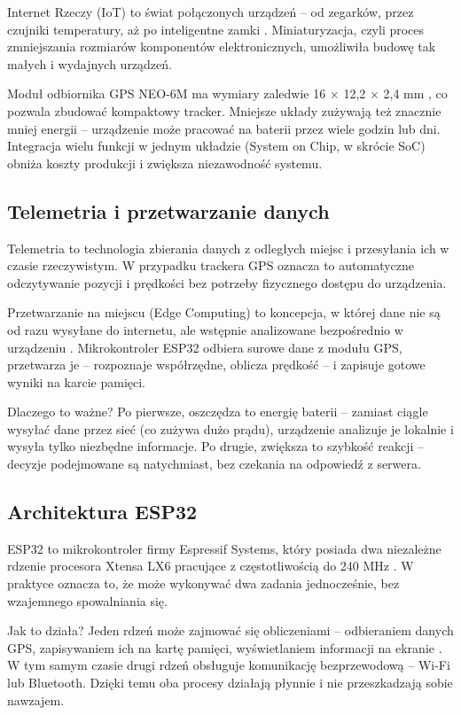 \documentclass[12pt, a4paper]{EE-dyplom}
\begin{document}
Internet Rzeczy (IoT) to świat połączonych urządzeń – od zegarków, przez czujniki temperatury, aż po inteligentne zamki \cite{botland_esp32, msalamon_rodziny}. Miniaturyzacja, czyli proces zmniejszania rozmiarów komponentów elektronicznych, umożliwiła budowę tak małych i wydajnych urządzeń.

Moduł odbiornika GPS NEO-6M ma wymiary zaledwie 16 × 12,2 × 2,4 mm \cite{ublox_datasheet}, co pozwala zbudować kompaktowy tracker. Mniejsze układy zużywają też znacznie mniej energii – urządzenie może pracować na baterii przez wiele godzin lub dni. Integracja wielu funkcji w jednym układzie (System on Chip, w skrócie SoC) obniża koszty produkcji i zwiększa niezawodność systemu.

\subsection{Telemetria i przetwarzanie danych}

Telemetria to technologia zbierania danych z odległych miejsc i przesyłania ich w czasie rzeczywistym. W przypadku trackera GPS oznacza to automatyczne odczytywanie pozycji i prędkości bez potrzeby fizycznego dostępu do urządzenia.

Przetwarzanie na miejscu (Edge Computing) to koncepcja, w której dane nie są od razu wysyłane do internetu, ale wstępnie analizowane bezpośrednio w urządzeniu \cite{sensors_edge}. Mikrokontroler ESP32 odbiera surowe dane z modułu GPS, przetwarza je – rozpoznaje współrzędne, oblicza prędkość – i zapisuje gotowe wyniki na karcie pamięci. 

Dlaczego to ważne? Po pierwsze, oszczędza to energię baterii – zamiast ciągle wysyłać dane przez sieć (co zużywa dużo prądu), urządzenie analizuje je lokalnie i wysyła tylko niezbędne informacje. Po drugie, zwiększa to szybkość reakcji – decyzje podejmowane są natychmiast, bez czekania na odpowiedź z serwera.

\subsection{Architektura ESP32}

ESP32 to mikrokontroler firmy Espressif Systems, który posiada dwa niezależne rdzenie procesora Xtensa LX6 pracujące z częstotliwością do 240 MHz \cite{esp32_trm, msalamon_rodziny}. W praktyce oznacza to, że może wykonywać dwa zadania jednocześnie, bez wzajemnego spowalniania się.

Jak to działa? Jeden rdzeń może zajmować się obliczeniami – odbieraniem danych GPS, zapisywaniem ich na kartę pamięci, wyświetlaniem informacji na ekranie \cite{electronics_lang}. W tym samym czasie drugi rdzeń obsługuje komunikację bezprzewodową – Wi-Fi lub Bluetooth. Dzięki temu oba procesy działają płynnie i nie przeszkadzają sobie nawzajem.
\end{document}
